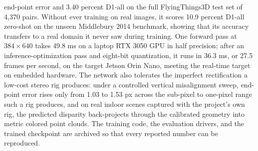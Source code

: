 end-point error and 3.40 percent D1-all on the full FlyingThings3D test
set of 4,370 pairs. Without ever training on real images, it scores
10.9 percent D1-all zero-shot on the unseen Middlebury 2014 benchmark,
showing that its accuracy transfers to a real domain it never saw
during training. One forward pass at $384 \times 640$ takes 49.8 ms on
a laptop RTX 3050 GPU in half precision; after an inference-optimization
pass and eight-bit quantization, it runs in 36.3 ms, or 27.5 frames per
second, on the target Jetson Orin Nano, meeting the real-time target on
embedded hardware. The network also tolerates the imperfect
rectification a low-cost stereo rig produces: under a controlled
vertical misalignment sweep, end-point error rises only from 1.03 to
1.53 px across the sub-pixel to one-pixel range such a rig produces,
and on real indoor scenes captured with the project's own rig, the
predicted disparity back-projects through the calibrated geometry into
metric colored point clouds. The training code, the evaluation drivers,
and the trained checkpoint are archived so that every reported number
can be reproduced.
